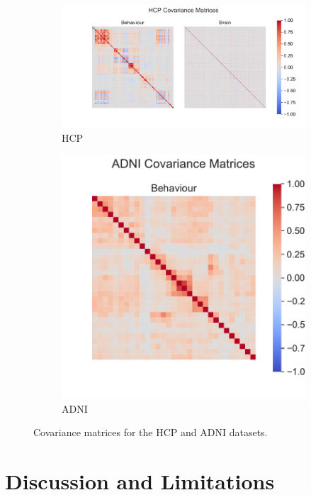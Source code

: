 \begin{figure}
\centering
\begin{subfigure}{0.66\linewidth}
\centering
\includegraphics[width=\linewidth]{figures/covariance/HCP_covariance}
\caption{HCP}
\end{subfigure}
%
\begin{subfigure}{0.33\linewidth}
\centering
\includegraphics[width=\linewidth]{figures/covariance/ADNI_covariance}
\caption{ADNI}
\end{subfigure}
\caption{Covariance matrices for the HCP and ADNI datasets.}
\label{fig:covariance-matrices-real}
\end{figure}

\section{Discussion and Limitations}

